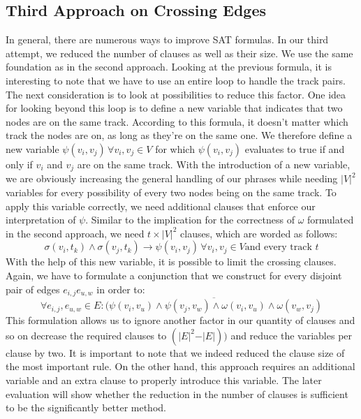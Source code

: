 \documentclass[bachelor, english]{algothesis}
\begin{document}
\subsection{Third Approach on Crossing Edges}
\label{sec:approach2_2}
In general, there are numerous ways to improve SAT formulas. In our third attempt, we reduced the number of clauses as well as their size. We use the same foundation as in the second approach. Looking at the previous formula, it is interesting to note that we have to use an entire loop to handle the track pairs. The next consideration is to look at possibilities to reduce this factor. \newline
One idea for looking beyond this loop is to define a new variable that indicates that two nodes are on the same track. According to this formula, it doesn't matter which track the nodes are on, as long as they're on the same one. We therefore define a new variable $\psi(v_i,v_j) \, \forall v_i,v_j \in V$  for which $\psi(v_i,v_j)$ evaluates to true if and only if $v_i$ and $v_j$ are on the same track. With the introduction of a new variable, we are obviously increasing the general handling of our phrases while needing ${\vert V \vert}^2$ variables for every possibility of every two nodes being on the same track. To apply this variable correctly, we need additional clauses that enforce our interpretation of $\psi$. Similar to the implication for the correctness of $\omega$ formulated in the second approach, we need $t \times {\vert V \vert}^2$ clauses, which are worded as follows:
    $$ \sigma(v_i,t_k) \land \sigma(v_j,t_k)\rightarrow \psi(v_i,v_j) \, \forall v_i,v_j \in V \text{and every track }t$$ 
With the help of this new variable, it is possible to limit the crossing clauses. Again, we have to formulate a conjunction that we construct for every disjoint pair of edges $e_{i,j} e_{u,w}$ in order to:
    $$ \forall e_{i,j}, e_{u,w} \in E : \overline{(\psi(v_i,v_u) \land \psi(v_j,v_w) \land   \omega(v_i,v_u) \land \omega(v_w,v_j)}$$ 
This formulation allows us to ignore another factor in our quantity of clauses and so on decrease the required clauses to $ (\vert E \vert^2 - \vert E \vert))$ and reduce the variables per clause by two. It is important to note that we indeed reduced the clause size of the most important rule. On the other hand, this approach requires an additional variable and an extra clause to properly introduce this variable. The later evaluation will show whether the reduction in the number of clauses is sufficient to be the significantly better method.
\end{document}
